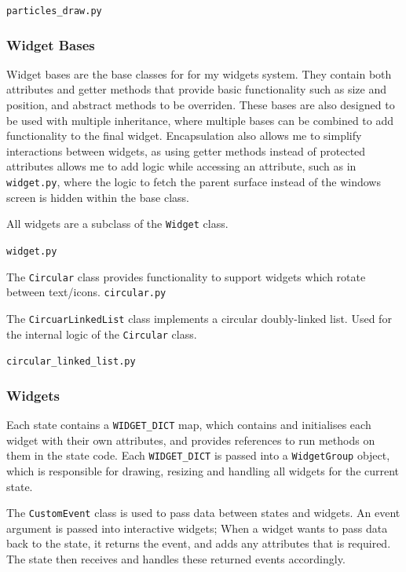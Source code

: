 \documentclass[../main/main.tex]{subfiles}
\begin{document}
\noindent\verb|particles_draw.py|


\subsubsection{Widget Bases}
\label{sec:widget-bases}
Widget bases are the base classes for for my widgets system. They contain both attributes and getter methods that provide basic functionality such as size and position, and abstract methods to be overriden. These bases are also designed to be used with multiple inheritance, where multiple bases can be combined to add functionality to the final widget. Encapsulation also allows me to simplify interactions between widgets, as using getter methods instead of protected attributes allows me to add logic while accessing an attribute, such as in \verb|widget.py|, where the logic to fetch the parent surface instead of the windows screen is hidden within the base class.

\bigskip
\noindent All widgets are a subclass of the \lstinline{Widget} class.

\noindent\verb|widget.py|


\bigskip
\noindent The \lstinline{Circular} class provides functionality to support widgets which rotate between text/icons.
\noindent\verb|circular.py|


\bigskip
\noindent The \lstinline{CircuarLinkedList} class implements a circular doubly-linked list. Used for the internal logic of the \lstinline{Circular} class.

\noindent\verb|circular_linked_list.py|


\subsubsection{Widgets}
\label{sec:widgets}
Each state contains a \lstinline{WIDGET_DICT} map, which contains and initialises each widget with their own attributes, and provides references to run methods on them in the state code. Each \lstinline{WIDGET_DICT} is passed into a \lstinline{WidgetGroup} object, which is responsible for drawing, resizing and handling all widgets for the current state.

The \lstinline{CustomEvent} class is used to pass data between states and widgets. An event argument is passed into interactive widgets; When a widget wants to pass data back to the state, it returns the event, and adds any attributes that is required. The state then receives and handles these returned events accordingly.
\end{document}
